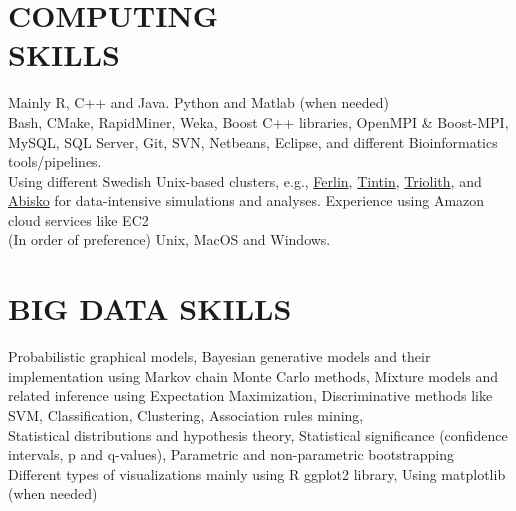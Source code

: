 \documentclass[margin, 10pt]{res} %
\begin{document}
\begin{resume}

\section{COMPUTING \\ SKILLS} 

{\bf \color{Brown}{Languages:}} 
Mainly R, C++ and Java. Python and Matlab (when needed)\\
{\bf \color{Brown}{Misc Tools:}} Bash, CMake, RapidMiner, Weka, Boost C++ libraries, OpenMPI \& Boost-MPI, MySQL, SQL Server, Git, SVN, Netbeans, Eclipse, and different Bioinformatics tools/pipelines. \\
{\bf \color{Brown}{HPC Clusters:}} Using different Swedish Unix-based clusters, e.g., \href{https://www.pdc.kth.se/resources/computers/historical-computers/ferlin}{Ferlin}, \href{http://www.uppmax.uu.se/}{Tintin}, \href{https://www.nsc.liu.se/systems/triolith/}{Triolith}, and \href{http://www.hpc2n.umu.se/resources/abisko}{Abisko} for data-intensive simulations and analyses. Experience using Amazon cloud services like EC2 \\
{\bf \color{Brown}{Operating Systems:}} (In order of preference) Unix, MacOS and Windows.

\section{BIG DATA SKILLS}
{\bf \color{Brown}{Machine Learning Skills:}} 
Probabilistic graphical models, Bayesian generative models and their implementation using Markov chain Monte Carlo methods, Mixture models and related inference using Expectation Maximization, Discriminative methods like SVM, Classification, Clustering, Association rules mining,   \\
{\bf \color{Brown}{Statistical Theory:}} Statistical distributions and hypothesis theory, Statistical significance (confidence intervals, p and q-values), Parametric and non-parametric bootstrapping \\
{\bf \color{Brown}{Statistical Visualization and reporting:}} Different types of visualizations mainly using R ggplot2 library, Using matplotlib (when needed)


\end{resume}
\end{document}
